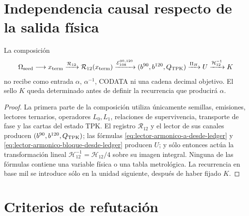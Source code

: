 \section{Independencia causal respecto de la salida física}

\begin{theorem}[Aislamiento de \(U\) y \(K\)]
\label{thm:aislamiento-u-k-alpha-codata}
La composición
\begin{equation}
 \Omega_{\rm seed}\longrightarrow x_{\rm term}
 \xrightarrow{\mathcal R_{12}}
 \mathcal R_{12}(x_{\rm term})
 \xrightarrow{\mathcal E_{108}^{90,120}}
 (b^{90},b^{120},Q_{\rm TPK})
 \xrightarrow{\Pi_H}U
 \xrightarrow{\mathcal H_{12}^{-1}}K
 \label{eq:composicion-upstream-u-k}
\end{equation}
no recibe como entrada \(\alpha\), \(\alpha^{-1}\), CODATA ni una cadena
decimal objetivo. El sello \(K\) queda determinado antes de definir la
recurrencia que producirá \(\alpha\).
\end{theorem}

\begin{proof}
La primera parte de la composición utiliza únicamente semillas, emisiones,
lectores ternarios, operadores \(L_0,L_1\), relaciones de supervivencia,
transporte de fase y las cartas del estado TPK. El registro
\(\mathcal R_{12}\) y el lector de sus canales producen
\((b^{90},b^{120},Q_{\rm TPK})\); las fórmulas
\eqref{eq:lector-armonico-a-desde-ledger} y
\eqref{eq:lector-armonico-bloque-desde-ledger} producen \(U\); y sólo
entonces actúa la transformación lineal
\(\mathcal H_{12}^{-1}=\mathcal H_{12}/4\) sobre su imagen integral.
Ninguna de las fórmulas contiene una variable física o una tabla
metrológica. La recurrencia en base mil se introduce sólo en la unidad
siguiente, después de haber fijado \(K\).
\end{proof}

\section{Criterios de refutación}

